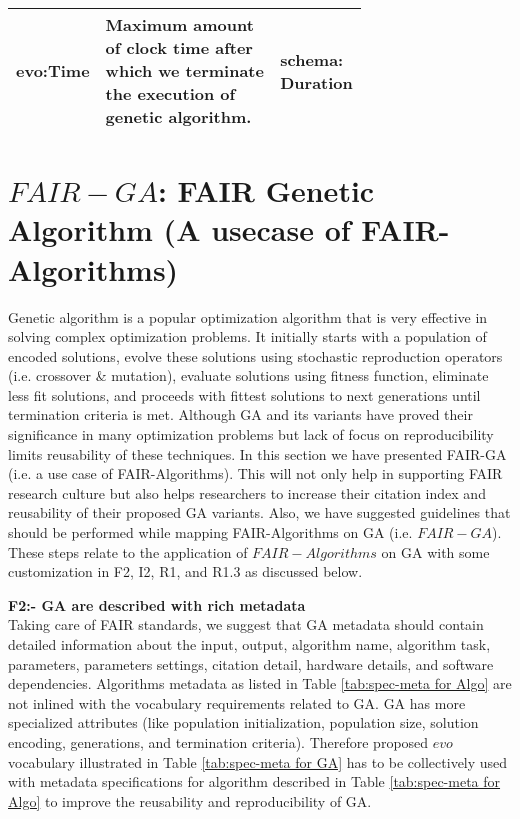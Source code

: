 \documentclass[preprint,12pt]{elsarticle}
\begin{document}
\begin{table}[H]
{\begin{tabular}{ | l | p{0.6\linewidth}| p{0.1\linewidth} |}





evo:Time & Maximum amount of clock time after which we terminate the execution of genetic algorithm. & schema: Duration  \\
\hline

\end{tabular}
}
\end{table}


\section{$FAIR-GA$: FAIR Genetic Algorithm (A usecase of FAIR-Algorithms)}  \label{sec:Fair for GA}
Genetic algorithm is a popular optimization algorithm that is very effective in solving complex optimization problems. It initially starts with a population of encoded solutions, evolve these solutions using stochastic reproduction operators (i.e. crossover \& mutation), evaluate solutions using fitness function, eliminate less fit solutions, and proceeds with fittest solutions to next generations until termination criteria is met. Although GA and its variants have proved their significance in many optimization problems but lack of focus on reproducibility limits reusability of these techniques. In this section we have presented FAIR-GA (i.e. a use case of FAIR-Algorithms). This will not only help in supporting FAIR research culture but also helps researchers to increase their citation index and reusability of their proposed GA variants. Also, we have suggested guidelines that should be performed while mapping FAIR-Algorithms on GA (i.e. $FAIR-GA$).  These steps relate to the application of $FAIR-Algorithms$ on GA with some customization in F2, I2, R1, and R1.3 as discussed below. 


\textbf{F2:- GA are described with rich metadata}\\
Taking care of FAIR standards, we suggest that GA metadata should contain detailed information about the input, output, algorithm name, algorithm task, parameters, parameters settings, citation detail, hardware details, and software dependencies. Algorithms metadata as listed in Table \ref{tab:spec-meta for Algo} are not inlined with the vocabulary requirements related to GA. GA has more specialized attributes (like population initialization, population size, solution encoding, generations, and termination criteria). Therefore proposed $evo$ vocabulary illustrated in Table \ref{tab:spec-meta for GA}  has to be collectively used with metadata specifications for algorithm described in Table \ref{tab:spec-meta for Algo} to improve the reusability and reproducibility of GA.  
\end{document}
